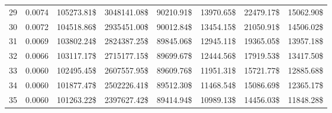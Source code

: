 \begin{tabular}{lrrrrrrr}
29 & \num{0.0074} & \num{105273.81}\$ & \num{3048141.08}\$ &  \num{90210.91}\$ & \num{13970.65}\$ & \num{22479.17}\$ & \num{15062.90}\$ \\
30 & \num{0.0072} & \num{104518.86}\$ & \num{2935451.00}\$ &  \num{90012.84}\$ & \num{13454.15}\$ & \num{21050.91}\$ & \num{14506.02}\$ \\
31 & \num{0.0069} & \num{103802.24}\$ & \num{2824387.25}\$ &  \num{89845.06}\$ & \num{12945.11}\$ & \num{19365.05}\$ & \num{13957.18}\$ \\
32 & \num{0.0066} & \num{103117.17}\$ & \num{2715177.15}\$ &  \num{89699.67}\$ & \num{12444.56}\$ & \num{17919.53}\$ & \num{13417.50}\$ \\
33 & \num{0.0060} & \num{102495.45}\$ & \num{2607557.95}\$ &  \num{89609.76}\$ & \num{11951.31}\$ & \num{15721.77}\$ & \num{12885.68}\$ \\
34 & \num{0.0060} & \num{101877.47}\$ & \num{2502226.41}\$ &  \num{89512.30}\$ & \num{11468.54}\$ & \num{15086.69}\$ & \num{12365.17}\$ \\
35 & \num{0.0060} & \num{101263.22}\$ & \num{2397627.42}\$ &  \num{89414.94}\$ & \num{10989.13}\$ & \num{14456.03}\$ & \num{11848.28}\$ \\
\bottomrule
\end{tabular}
